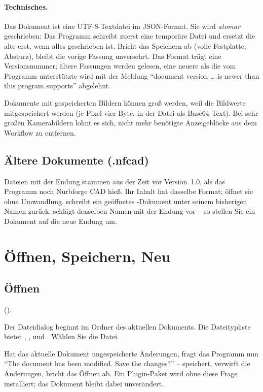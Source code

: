 \paragraph{Technisches.} Das Dokument ist eine UTF-8-Textdatei im JSON-Format. Sie wird
\emph{atomar} geschrieben: Das Programm schreibt zuerst eine temporäre Datei und ersetzt die
alte erst, wenn alles geschrieben ist. Bricht das Speichern ab (volle Festplatte, Absturz),
bleibt die vorige Fassung unversehrt. Das Format trägt eine Versionsnummer; ältere Fassungen
werden gelesen, eine neuere als die vom Programm unterstützte wird mit der Meldung
\enquote{document version \dots{} is newer than this program supports} abgelehnt.

\begin{hinweis}
Dokumente mit gespeicherten Bildern können groß werden, weil die Bildwerte mitgespeichert
werden (je Pixel vier Byte, in der Datei als Base64-Text). Bei sehr großen Kamerabildern
lohnt es sich, nicht mehr benötigte Anzeigeblöcke aus dem Workflow zu entfernen.
\end{hinweis}

\subsection{Ältere Dokumente (.nfcad)}\label{sec:nfcad}

Dateien mit der Endung  stammen aus der Zeit vor Version~1.0, als das Programm
noch Nurbforge CAD hieß. Ihr Inhalt hat dasselbe Format; \produkt{} öffnet sie ohne
Umwandlung.  schreibt ein geöffnetes -Dokument unter seinem
bisherigen Namen zurück.  schlägt denselben Namen mit der Endung
 vor -- so stellen Sie ein Dokument auf die neue Endung um.

\section{Öffnen, Speichern, Neu}\label{sec:oeffnen-speichern}

\subsection{Öffnen}

\begin{schritte}
  \item {} ().
  \item Der Dateidialog beginnt im Ordner des aktuellen Dokuments. Die Dateitypliste bietet
    , ,  und . Wählen Sie die Datei.
  \item Hat das aktuelle Dokument ungespeicherte Änderungen, fragt das Programm nun
    \enquote{The document has been modified. Save the changes?} --  speichert,
     verwirft die Änderungen,  bricht das Öffnen ab. Ein
    Plugin-Paket wird ohne diese Frage installiert; das Dokument bleibt dabei unverändert.
\end{schritte}

